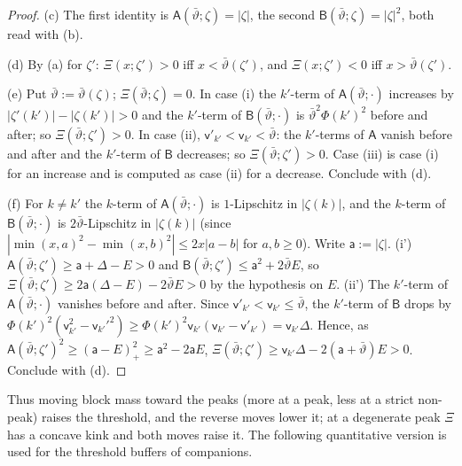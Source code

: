 \documentclass[10pt]{amsart}
\theoremstyle{definition}
\theoremstyle{remark}
\begin{document}
\begin{proof}
(c) The first identity is $\mathsf A(\bar\vartheta;\zeta)=|\zeta|$, the second
$\mathsf B(\bar\vartheta;\zeta)=|\zeta|^2$, both read with (b).

(d) By (a) for $\zeta'$: $\Xi(x;\zeta')>0$ iff $x<\bar\vartheta(\zeta')$, and
$\Xi(x;\zeta')<0$ iff $x>\bar\vartheta(\zeta')$.

(e) Put $\bar\vartheta:=\bar\vartheta(\zeta)$; $\Xi(\bar\vartheta;\zeta)=0$.  In
case (i) the $k'$-term of $\mathsf A(\bar\vartheta;\cdot)$ increases by
$|\zeta'(k')|-|\zeta(k')|>0$ and the $k'$-term of $\mathsf B(\bar\vartheta;
\cdot)$ is $\bar\vartheta^2\Phi(k')^2$ before and after; so
$\Xi(\bar\vartheta;\zeta')>0$.  In case (ii), $\mathsf v'_{k'}<\mathsf
v_{k'}<\bar\vartheta$: the $k'$-terms of $\mathsf A$ vanish before and after
and the $k'$-term of $\mathsf B$ decreases; so $\Xi(\bar\vartheta;\zeta')>0$.
Case (iii) is case (i) for an increase and is computed as case (ii) for a
decrease.  Conclude with (d).

(f) For $k\ne k'$ the $k$-term of $\mathsf A(\bar\vartheta;\cdot)$ is
$1$-Lipschitz in $|\zeta(k)|$, and the $k$-term of $\mathsf B(\bar\vartheta;
\cdot)$ is $2\bar\vartheta$-Lipschitz in $|\zeta(k)|$ (since
$|\min(x,a)^2-\min(x,b)^2|\le2x|a-b|$ for $a,b\ge0$).  Write $\mathsf
a:=|\zeta|$.  (i') $\mathsf A(\bar\vartheta;\zeta')\ge\mathsf a+\Delta-E>0$
and $\mathsf B(\bar\vartheta;\zeta')\le\mathsf a^2+2\bar\vartheta E$, so
$\Xi(\bar\vartheta;\zeta')\ge2\mathsf a(\Delta-E)-2\bar\vartheta E>0$ by the
hypothesis on $E$.  (ii') The $k'$-term of $\mathsf A(\bar\vartheta;\cdot)$
vanishes before and after.  Since $\mathsf v'_{k'}<\mathsf v_{k'}\le
\bar\vartheta$, the $k'$-term of $\mathsf B$ drops by $\Phi(k')^2(\mathsf
v_{k'}^2-\mathsf v_{k'}'^2)\ge\Phi(k')^2\mathsf v_{k'}(\mathsf v_{k'}-\mathsf
v'_{k'})=\mathsf v_{k'}\Delta$.  Hence, as $\mathsf A(\bar\vartheta;\zeta')^2
\ge(\mathsf a-E)_+^2\ge\mathsf a^2-2\mathsf aE$,
$\Xi(\bar\vartheta;\zeta')\ge\mathsf v_{k'}\Delta-2(\mathsf a+\bar\vartheta)E>0$.
Conclude with (d).
\end{proof}

Thus moving block mass toward the peaks (more at a peak, less at a strict
non-peak) raises the threshold, and the reverse moves lower it; at a
degenerate peak $\Xi$ has a concave kink and both moves raise it.  The
following quantitative version is used for the threshold buffers of
companions.
\end{document}
